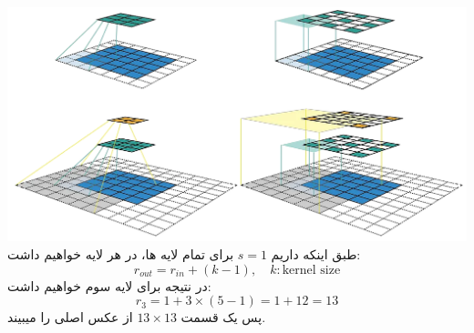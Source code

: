 \begin{itemize}
{	      \begin{qsolve}[]
		      \includegraphics*[width=\linewidth]{pics/receptive.png}
		      طبق اینکه داریم $s=1$ برای تمام لایه ها، در هر لایه خواهیم داشت:
		      \[
			      r_{out}=r_{in}+(k-1),\quad k:\text{kernel size}
		      \]
		      در نتیجه برای  لایه سوم خواهیم داشت:
		      \[
			      r_3 = 1 + 3\times(5-1)= 1 + 12 = 13
		      \]
		      پس یک قسمت $13\times13$ از عکس اصلی را میبیند.
	      \end{qsolve}
	      }
\end{itemize}